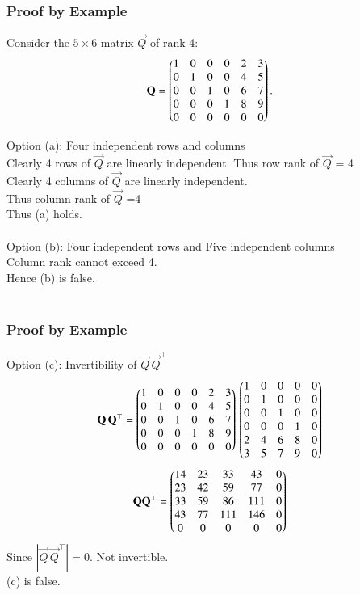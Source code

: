 \documentclass{beamer}
\begin{document}
\begin{frame}[fragile]
    \frametitle{Proof by Example}
Consider the $5\times6$ matrix $\vec{Q}$ of rank 4:
\begin{equation}
\mathbf{Q}
=
\begin{pmatrix}
1 & 0 & 0 & 0 & 2 & 3\\
0 & 1 & 0 & 0 & 4 & 5\\
0 & 0 & 1 & 0 & 6 & 7\\
0 & 0 & 0 & 1 & 8 & 9\\
0 & 0 & 0 & 0 & 0 & 0
\end{pmatrix}.
\end{equation}

Option (a): Four independent rows and columns\\
Clearly 4 rows of $\vec{Q}$ are linearly independent. Thus row rank of $\vec{Q}$ = 4\\
Clearly 4 columns of $\vec{Q}$ are linearly independent.\\ 
Thus column rank of $\vec{Q}$ =4\\
Thus (a) holds.\\\\
Option (b): Four independent rows and Five independent columns\\
Column rank cannot exceed 4.\\
Hence (b) is false.\\\\
\end{frame}

\begin{frame}[fragile]
    \frametitle{Proof by Example}

Option (c): Invertibility of $\vec{Q}\,\vec{Q}^\top$\\

\begin{equation}
\mathbf{Q}\,\mathbf{Q}^\top
=
\begin{pmatrix}
1&0&0&0&2&3\\
0&1&0&0&4&5\\
0&0&1&0&6&7\\
0&0&0&1&8&9\\
0&0&0&0&0&0
\end{pmatrix}
\,
\begin{pmatrix}
1&0&0&0&0\\
0&1&0&0&0\\
0&0&1&0&0\\
0&0&0&1&0\\
2&4&6&8&0\\
3&5&7&9&0
\end{pmatrix}
\end{equation}
\begin{equation}
    \mathbf{Q}\mathbf{Q}^\top =
\begin{pmatrix}
14&23&33&43&0\\
23&42&59&77&0\\
33&59&86&111&0\\
43&77&111&146&0\\
0&0&0&0&0
\end{pmatrix}
\end{equation}
Since $|\vec{Q}\,\vec{Q}^\top|=0$. Not invertible.\\ 
(c) is false.
\end{frame}
\end{document}
